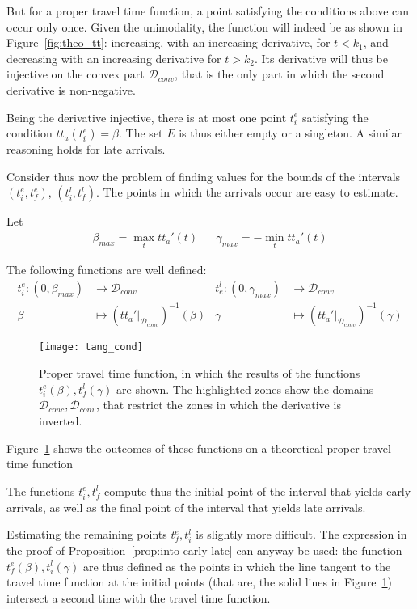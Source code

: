 But for a proper travel time function,
a point satisfying the conditions above can occur only once.
Given the unimodality,
the function will indeed be as shown in Figure~\ref{fig:theo_tt}: increasing, with an increasing derivative,
for \(t < k_1\), and decreasing with an increasing derivative for \(t > k_2\).
Its derivative will thus be injective on the convex part \(\mathcal{D}_{conv}\),
that is the only part in which the second derivative is non-negative.

Being the derivative injective,
there is at most one point \(t_i^e\) satisfying the condition \(tt_a(t_i^e) = \beta\).
The set \(E\) is thus either empty or a singleton.
A similar reasoning holds for late arrivals.

Consider thus now the problem of finding values for the bounds of the intervals \((t_i^e, t_f^e)\), \((t_i^l, t_f^l)\).
The points in which the arrivals occur are easy to estimate.

Let
\begin{align*}
  \beta_{max} = \max_t tt_a'(t) && \gamma_{max} = -\min_t tt_a'(t)
\end{align*}

The following functions are well defined:
\begin{align*}
  t_i^e: (0, \beta_{max}) & \rightarrow \mathcal{D}_{conv}  & t_e^l: (0, \gamma_{max}) & \rightarrow \mathcal{D}_{conv} \\
       \beta & \mapsto (tt_a' |_{\mathcal{D}_{conv}})^{-1}(\beta) & \gamma & \mapsto(tt_a' |_{\mathcal{D}_{conv}})^{-1}(\gamma)
\end{align*}

\begin{figure}
  \centering
  \texttt{[image: tang\_cond]}
  \caption{
    Proper travel time function,
    in which the results of the functions \(t_i^e(\beta), t_f^l(\gamma)\) are shown.
    The highlighted zones show the domains \(\mathcal{D}_{conc}, \mathcal{D}_{conv}\),
    that restrict the zones in which the derivative is inverted.
}
  \label{fig:tang-cond}
\end{figure}

Figure~\ref{fig:tang-cond} shows the outcomes of these functions on a theoretical proper travel time function

The functions \(t_i^e, t_f^l\) compute thus the initial point of the interval that yields early arrivals,
as well as the final point of the interval that yields late arrivals.

Estimating the remaining points \(t_f^e, t_i^l\) is slightly more difficult.
The expression in the proof of Proposition~\ref{prop:into-early-late} can anyway be used:
the function \(t_f^e(\beta), t_i^l(\gamma)\)
are thus defined as the points in which the line tangent to the travel time function at the initial points
(that are, the solid lines in Figure~\ref{fig:tang-cond})
intersect a second time with the travel time function.

